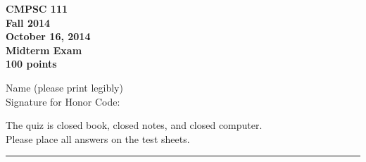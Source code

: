 \documentclass[11pt]{report}
\begin{document}
\thispagestyle{empty}
\begin{center}
\bf CMPSC 111\\
Fall 2014\\
October 16, 2014\\
Midterm Exam\\
100 points

\vspace{1in}
Name (please print legibly) \underline{\hspace{3in}}\\

\bigskip
Signature for Honor Code: \underline{\hspace{3in}}\\
\end{center}

\medskip
\noindent
The quiz is closed book, closed notes, and closed computer. \\
Please place all answers on the test sheets. 

\begin{center}\rule{4in}{1pt} \end{center}
\end{document}
